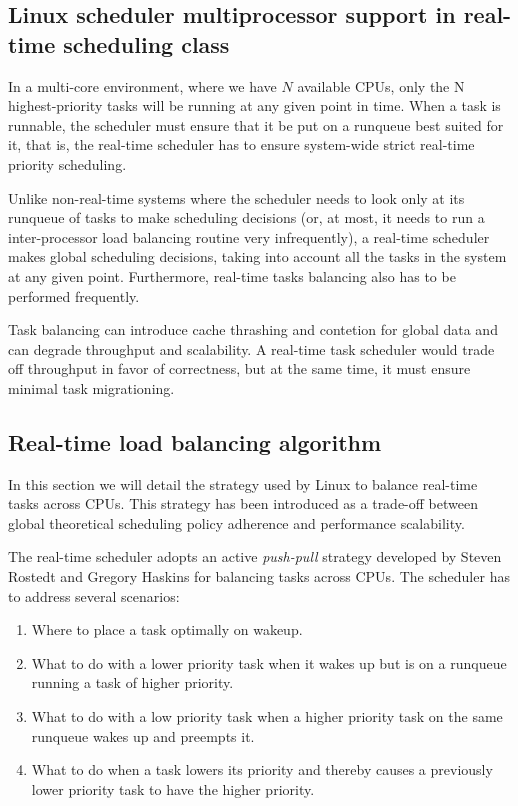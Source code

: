 \subsection{Linux scheduler multiprocessor support in real-time scheduling class\label{sec:MULTICORERT}}

In a multi-core environment, where we have $N$ available CPUs, 
only the N highest-priority tasks will be running 
at any given point in time. When a task is runnable, the scheduler 
must ensure that it be put on a runqueue best suited for it, that is, 
the real-time scheduler has to ensure system-wide strict real-time priority 
scheduling.

Unlike non-real-time systems where the scheduler needs to look only at
its runqueue of tasks to make scheduling decisions (or, at most, it
needs to run a inter-processor load balancing routine very
infrequently), a real-time scheduler makes global scheduling
decisions, taking into account all the tasks in the system at any
given point. Furthermore, real-time tasks balancing also has to be
performed frequently.

Task balancing can introduce cache thrashing and contetion for global
data and can degrade throughput and scalability. A real-time task
scheduler would trade off throughput in favor of correctness, but at
the same time, it must ensure minimal task migrationing.

\subsection{Real-time load balancing algorithm\label{sec:MULTICORERT_PUSH_PULL}}

In this section we will detail the strategy used by Linux to balance
real-time tasks across CPUs. This strategy has been introduced as a
trade-off between global theoretical scheduling policy adherence and
performance scalability.

The real-time scheduler adopts an active \emph{push-pull} strategy
developed by Steven Rostedt and Gregory Haskins for balancing tasks
across CPUs. The scheduler has to address several scenarios:

\begin{enumerate}
\item\label{itm1:item1} Where to place a task optimally on wakeup.
\item\label{itm1:item2} What to do with a lower priority task when it wakes up but is on a
runqueue running a task of higher priority.
\item\label{itm1:item3} What to do with a low priority task when a higher priority task on
the same runqueue wakes up and preempts it.
\item\label{itm1:item4} What to do when a task lowers its priority and thereby causes 
a previously lower priority task to have the higher priority.
\end{enumerate}

